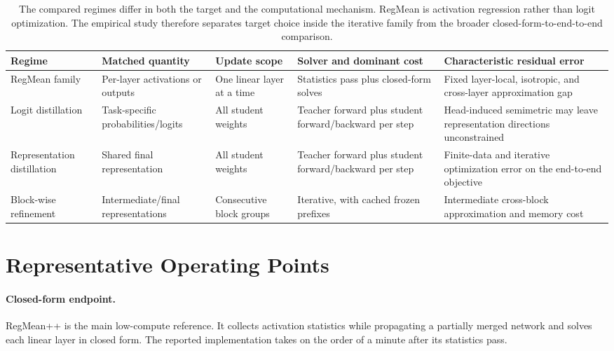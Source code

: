 \documentclass[letterpaper]{article} %
\theoremstyle{plain}
\theoremstyle{definition}
\begin{document}
\begin{table}[tb]
\centering
\small
\setlength{\tabcolsep}{4pt}
\begin{tabular}{p{}p{}p{}p{}p{}}
\toprule
Regime & Matched quantity & Update scope & Solver and dominant cost & Characteristic residual error \\
\midrule
RegMean family & Per-layer activations or outputs & One linear layer at a time & Statistics pass plus closed-form solves & Fixed layer-local, isotropic, and cross-layer approximation gap \\
Logit distillation & Task-specific probabilities/logits & All student weights & Teacher forward plus student forward/backward per step & Head-induced semimetric may leave representation directions unconstrained \\
Representation distillation & Shared final representation & All student weights & Teacher forward plus student forward/backward per step & Finite-data and iterative optimization error on the end-to-end objective \\
Block-wise refinement & Intermediate/final representations & Consecutive block groups & Iterative, with cached frozen prefixes & Intermediate cross-block approximation and memory cost \\
\bottomrule
\end{tabular}
\caption{The compared regimes differ in both the target and the computational mechanism.
RegMean is activation regression rather than logit optimization.
The empirical study therefore separates target choice inside the iterative family from the broader closed-form-to-end-to-end comparison.}
\label{tab:regime-comparison}
\end{table}

\section{Representative Operating Points}
\label{sec:method}

\paragraph{Closed-form endpoint.}
RegMean++ is the main low-compute reference.
It collects activation statistics while propagating a partially merged network and solves each linear layer in closed form.
The reported implementation takes on the order of a minute after its statistics pass.
\end{document}
